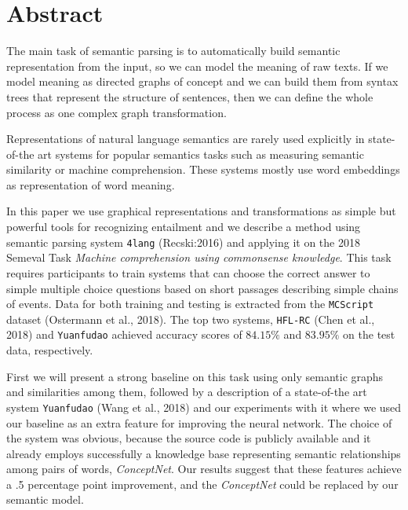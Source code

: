\chapter*{Abstract}
The main task of semantic parsing is to automatically build semantic representation from the input, so we can model the meaning
of raw texts. If we model meaning as directed graphs of concept and we can build them from syntax trees that represent the structure of 
sentences, then we can define the whole process as one complex graph transformation.

Representations of natural language semantics are rarely used explicitly in state-of-the art systems for popular semantics tasks such as measuring semantic similarity or machine comprehension. These systems mostly use word embeddings as representation of word meaning.

In this paper we use graphical representations and transformations as simple but powerful tools for recognizing entailment and we describe a method using semantic parsing system \texttt{4lang} (Recski:2016) and applying it on the 2018 Semeval Task \textit{Machine comprehension using commonsense knowledge}. This task requires participants to train systems that can choose the correct answer to simple multiple choice questions based on short passages describing simple chains of events. Data for both training and testing is extracted from the \texttt{MCScript} dataset (Ostermann et al., 2018). The top two systems, \texttt{HFL-RC} (Chen et al., 2018) and \texttt{Yuanfudao} achieved accuracy scores of $84.15\%$ and $83.95\%$ on the test data, respectively.

First we will present a strong baseline on this task using only semantic graphs and similarities among them, followed by 
a description of a state-of-the art system \texttt{Yuanfudao} (Wang et al., 2018) and our experiments with it where
we used our baseline as an extra feature for improving the neural network. The choice of the system was obvious, because the source code is publicly available and it already employs successfully a knowledge base representing semantic relationships among pairs of words, \textit{ConceptNet}.
Our results suggest that these features achieve a .5 percentage point improvement, and the \textit{ConceptNet} could be replaced by our semantic model.
\vfill

